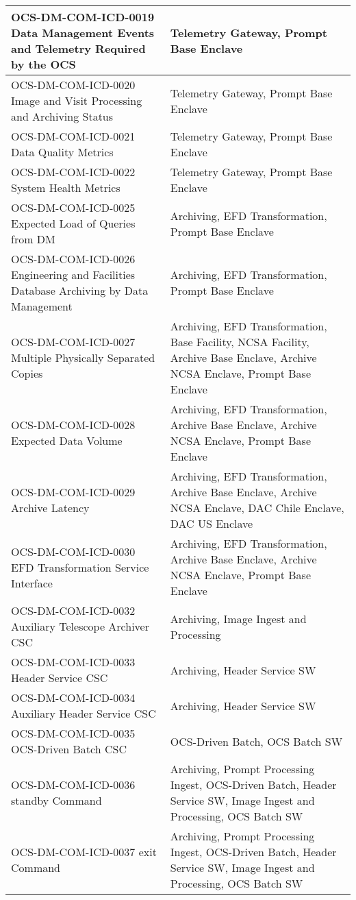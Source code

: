\begin{longtable}{p{}p{}}
OCS-DM-COM-ICD-0019 Data Management Events and Telemetry Required by the OCS & Telemetry Gateway, Prompt Base Enclave \\ \hline
OCS-DM-COM-ICD-0020 Image and Visit Processing and Archiving Status & Telemetry Gateway, Prompt Base Enclave \\ \hline
OCS-DM-COM-ICD-0021 Data Quality Metrics & Telemetry Gateway, Prompt Base Enclave \\ \hline
OCS-DM-COM-ICD-0022 System Health Metrics & Telemetry Gateway, Prompt Base Enclave \\ \hline
OCS-DM-COM-ICD-0025 Expected Load of Queries from DM & Archiving, EFD Transformation, Prompt Base Enclave \\ \hline
OCS-DM-COM-ICD-0026 Engineering and Facilities Database Archiving by Data Management & Archiving, EFD Transformation, Prompt Base Enclave \\ \hline
OCS-DM-COM-ICD-0027 Multiple Physically Separated Copies & Archiving, EFD Transformation, Base Facility, NCSA Facility, Archive Base Enclave, Archive NCSA Enclave, Prompt Base Enclave \\ \hline
OCS-DM-COM-ICD-0028 Expected Data Volume & Archiving, EFD Transformation, Archive Base Enclave, Archive NCSA Enclave, Prompt Base Enclave \\ \hline
OCS-DM-COM-ICD-0029 Archive Latency & Archiving, EFD Transformation, Archive Base Enclave, Archive NCSA Enclave, DAC Chile Enclave, DAC US Enclave \\ \hline
OCS-DM-COM-ICD-0030 EFD Transformation Service Interface & Archiving, EFD Transformation, Archive Base Enclave, Archive NCSA Enclave, Prompt Base Enclave \\ \hline
OCS-DM-COM-ICD-0032 Auxiliary Telescope Archiver CSC & Archiving, Image Ingest and Processing \\ \hline
OCS-DM-COM-ICD-0033 Header Service CSC & Archiving, Header Service SW \\ \hline
OCS-DM-COM-ICD-0034 Auxiliary Header Service CSC & Archiving, Header Service SW \\ \hline
OCS-DM-COM-ICD-0035 OCS-Driven Batch CSC & OCS-Driven Batch, OCS Batch SW \\ \hline
OCS-DM-COM-ICD-0036 standby Command & Archiving, Prompt Processing Ingest, OCS-Driven Batch, Header Service SW, Image Ingest and Processing, OCS Batch SW \\ \hline
OCS-DM-COM-ICD-0037 exit Command & Archiving, Prompt Processing Ingest, OCS-Driven Batch, Header Service SW, Image Ingest and Processing, OCS Batch SW \\ \hline

\end{longtable}
